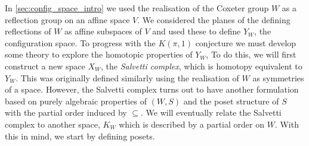 \documentclass[class=article, crop=false]{standalone}
\begin{document}
In \cref{sec:config_space_intro} we used the realisation of the Coxeter group $W$ as a reflection group on an affine space $V$. We considered the planes of the defining reflections of $W$ as affine subspaces of $V$ and used these to define $Y_W$, the configuration space. To progress with the $K(\pi,1 )$ conjecture we must develop some theory to explore the homotopic properties of $Y_W$, To do this, we will first construct a new space $X_W$, the \emph{Salvetti complex}, which is homotopy equivalent to $Y_W$. This was originally defined \cite{salvetti_topology_1987, salvetti_homotopy_1994} similarly using the realisation of $W$ as symmetries of a space. However, the Salvetti complex turns out to have another formulation based on purely algebraic properties of $(W,S)$ and the poset structure of $S$ with the partial order induced by $\subseteq$. We will eventually relate the Salvetti complex to another space, $K_W$ which is described by a partial order on $W$. With this in mind, we start by defining posets.
\end{document}
